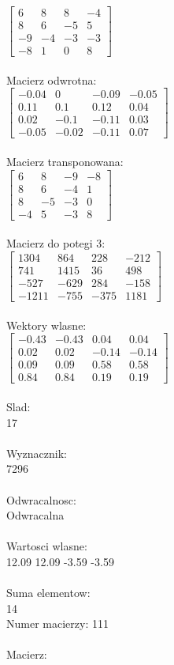 \documentclass[a4paper,12pt]{article}
\begin{document}
$\begin{bmatrix} 6&8&8&-4\\8&6&-5&5\\-9&-4&-3&-3\\-8&1&0&8 \end{bmatrix}$
\\
\\
Macierz odwrotna:\\

$\begin{bmatrix} -0.04&0&-0.09&-0.05\\0.11&0.1&0.12&0.04\\0.02&-0.1&-0.11&0.03\\-0.05&-0.02&-0.11&0.07 \end{bmatrix}$
\\
\\
Macierz transponowana:\\

$\begin{bmatrix} 6&8&-9&-8\\8&6&-4&1\\8&-5&-3&0\\-4&5&-3&8 \end{bmatrix}$
\\
\\
Macierz do potegi 3:\\

$\begin{bmatrix} 1304&864&228&-212\\741&1415&36&498\\-527&-629&284&-158\\-1211&-755&-375&1181 \end{bmatrix}$
\\
\\
Wektory wlasne:\\

$\begin{bmatrix} -0.43&-0.43&0.04&0.04\\0.02&0.02&-0.14&-0.14\\0.09&0.09&0.58&0.58\\0.84&0.84&0.19&0.19 \end{bmatrix}$
\\
\\
Slad:\\
17
\\
\\
Wyznacznik:\\
7296
\\
\\
Odwracalnosc:\\
Odwracalna
\\
\\
Wartosci wlasne:\\
12.09 12.09 -3.59 -3.59
\\
\\
Suma elementow:\\
14
\\
\newpage
Numer macierzy:
111
\\
\\
Macierz:\\
\end{document}
